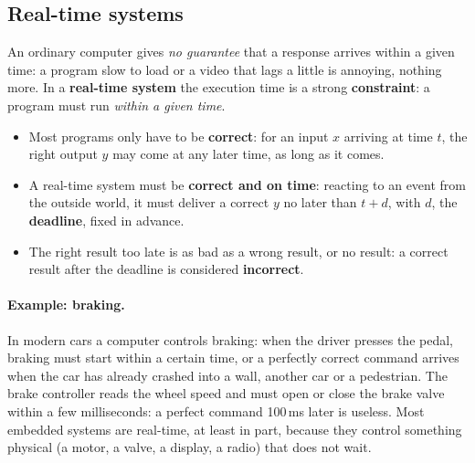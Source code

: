 \subsection{Real-time systems}
An ordinary computer gives \emph{no guarantee} that a response arrives within a given time: a program slow to load or a video that lags a little is annoying, nothing more. In a \textbf{real-time system} the execution time is a strong \textbf{constraint}: a program must run \emph{within a given time}.
\begin{itemize}
    \item Most programs only have to be \textbf{correct}: for an input $x$ arriving at time $t$, the right output $y$ may come at any later time, as long as it comes.
    \item A real-time system must be \textbf{correct and on time}: reacting to an event from the outside world, it must deliver a correct $y$ no later than $t + d$, with $d$, the \textbf{deadline}, fixed in advance.
    \item The right result too late is as bad as a wrong result, or no result: a correct result after the deadline is considered \textbf{incorrect}.
\end{itemize}
\paragraph{Example: braking.} In modern cars a computer controls braking: when the driver presses the pedal, braking must start within a certain time, or a perfectly correct command arrives when the car has already crashed into a wall, another car or a pedestrian. The brake controller reads the wheel speed and must open or close the brake valve within a few milliseconds: a perfect command 100\,ms later is useless. Most embedded systems are real-time, at least in part, because they control something physical (a motor, a valve, a display, a radio) that does not wait.

